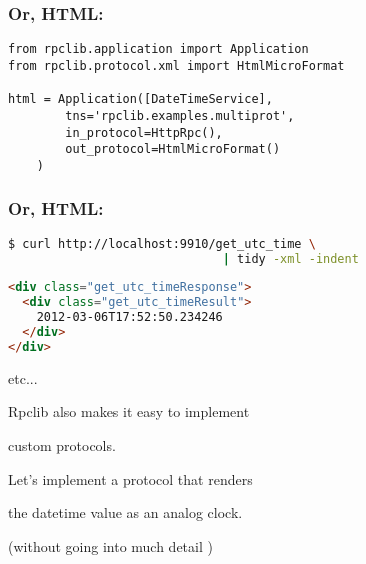 \documentclass{beamer}
\begin{document}
\begin{frame}[fragile]
  \frametitle{Or, HTML:}

  \begin{lstlisting}
from rpclib.application import Application
from rpclib.protocol.xml import HtmlMicroFormat

html = Application([DateTimeService],
        tns='rpclib.examples.multiprot',
        in_protocol=HttpRpc(),
        out_protocol=HtmlMicroFormat()
    )
  \end{lstlisting}
\end{frame}


\begin{frame}[fragile]
  \frametitle{Or, HTML:}

  \begin{lstlisting}[language=sh,frame=topline]
$ curl http://localhost:9910/get_utc_time \
                              | tidy -xml -indent
  \end{lstlisting}
  \begin{lstlisting}[language=html, frame=bottomline]
<div class="get_utc_timeResponse">
  <div class="get_utc_timeResult">
    2012-03-06T17:52:50.234246
  </div>
</div>
  \end{lstlisting}
\end{frame}


\begin{frame}
  \LARGE
  \begin{center}
    etc...
  \end{center}
\end{frame}

\begin{frame}
  \LARGE
  \begin{center}
    Rpclib also makes it easy to implement

    \bigskip

    custom protocols.
  \end{center}
\end{frame}

\begin{frame}
  \LARGE
  \begin{center}
    Let's implement a protocol that renders

    \bigskip

    the datetime value as an analog clock.

    \bigskip

    \pause
    \large
    (without going into much detail \smiley)

  \end{center}
\end{frame}
\end{document}
